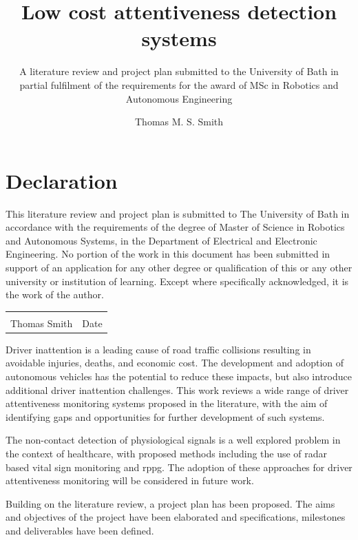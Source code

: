 \documentclass[11pt, parskip=half*,twoside=false]{scrbook}
\title{Low cost attentiveness detection systems}
\author{Thomas M. S. Smith}
\subtitle{A literature review and project plan submitted to the University of Bath in partial fulfilment of the requirements for the award of MSc in Robotics and Autonomous Engineering}
\begin{document}
\maketitle

\frontmatter

\chapter*{Declaration}

This literature review and project plan is submitted to The University of Bath in accordance with the requirements of the degree of Master of Science in Robotics and Autonomous Systems, in the Department of Electrical and Electronic Engineering. No portion of the work in this document has been submitted in support of an application for any other degree or qualification of this or any other university or institution of learning. Except where specifically acknowledged, it is the work of the author.

\vskip 2cm
\noindent\begin{tabular}{@{}p{}p{}@{}}
	\dotfill                         & \dotfill\\
	Thomas Smith              & Date\\
\end{tabular} 


Driver inattention is a leading cause of road traffic collisions resulting in avoidable injuries, deaths, and economic cost.
The development and adoption of autonomous vehicles has the potential to reduce these impacts, but also introduce additional driver inattention challenges. This work reviews a wide range of driver attentiveness monitoring systems proposed in the literature, with the aim of identifying gaps and opportunities for further development of such systems.

The non-contact detection of physiological signals is a well explored problem in the context of healthcare, with proposed methods including the use of radar based vital sign monitoring and \gls{rppg}. The adoption of these approaches for driver attentiveness monitoring will be considered in future work.

Building on the literature review, a project plan has been proposed. The aims and objectives of the project have been elaborated and specifications, milestones and deliverables have been defined.

\tableofcontents
\end{document}
